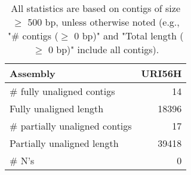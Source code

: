 \documentclass[12pt,a4paper]{article}
\begin{document}
\begin{table}[ht]
\begin{center}
\caption{All statistics are based on contigs of size $\geq$ 500 bp, unless otherwise noted (e.g., "\# contigs ($\geq$ 0 bp)" and "Total length ($\geq$ 0 bp)" include all contigs).}
\begin{tabular}{|l*{1}{|r}|}
\hline
Assembly & URI56H \\ \hline
\# fully unaligned contigs & 14 \\ \hline
Fully unaligned length & 18396 \\ \hline
\# partially unaligned contigs & 17 \\ \hline
Partially unaligned length & 39418 \\ \hline
\# N's & 0 \\ \hline
\end{tabular}
\end{center}
\end{table}
\end{document}
